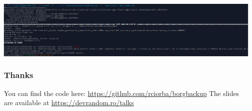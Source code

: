\documentclass{beamer}
\begin{document}
\begin{frame}
 \begin{center}
 \includegraphics[scale=0.26,keepaspectratio=true]{./sigabrt.png}
 \end{center}
\end{frame}

\begin{frame}
  \frametitle{Thanks}
  You can find the code here:
  \href{https://github.com/rciorba/borgbackup}{https://github.com/rciorba/borgbackup}
  \newline
  \newline
  The slides are available at
  \href{https://devrandom.ro/talks}{https://devrandom.ro/talks}
\end{frame}
\end{document}
